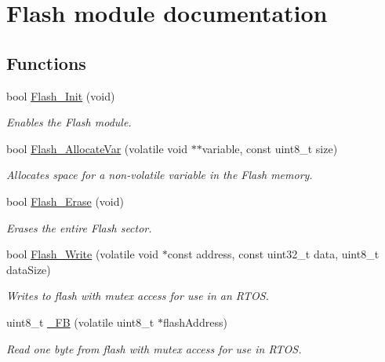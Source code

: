 \hypertarget{group___flash__module}{}\section{Flash module documentation}
\label{group___flash__module}
\subsection*{Functions}
\begin{DoxyCompactItemize}
\item 
bool \hyperlink{group___flash__module_gaa5782279b5e558cafc2f135c0a1177d3}{Flash\+\_\+\+Init} (void)
\begin{DoxyCompactList}\small\item\em Enables the Flash module. \end{DoxyCompactList}\item 
bool \hyperlink{group___flash__module_ga50871aff0f5af1e092aea3ed2545cf72}{Flash\+\_\+\+Allocate\+Var} (volatile void $\ast$$\ast$variable, const uint8\+\_\+t size)
\begin{DoxyCompactList}\small\item\em Allocates space for a non-\/volatile variable in the Flash memory. \end{DoxyCompactList}\item 
bool \hyperlink{group___flash__module_ga06868787ccef73e69bd236d3b93b68f3}{Flash\+\_\+\+Erase} (void)
\begin{DoxyCompactList}\small\item\em Erases the entire Flash sector. \end{DoxyCompactList}\item 
bool \hyperlink{group___flash__module_ga65d0676992303c4a7d5a5cea121a409b}{Flash\+\_\+\+Write} (volatile void $\ast$const address, const uint32\+\_\+t data, uint8\+\_\+t data\+Size)
\begin{DoxyCompactList}\small\item\em Writes to flash with mutex access for use in an R\+T\+O\+S. \end{DoxyCompactList}\item 
uint8\+\_\+t \hyperlink{group___flash__module_ga19cb5862dfb60718b63095ee9b427338}{\+\_\+\+F\+B} (volatile uint8\+\_\+t $\ast$flash\+Address)
\begin{DoxyCompactList}\small\item\em Read one byte from flash with mutex access for use in R\+T\+O\+S. \end{DoxyCompactList}\item 
$$
\end{DoxyCompactItemize}
